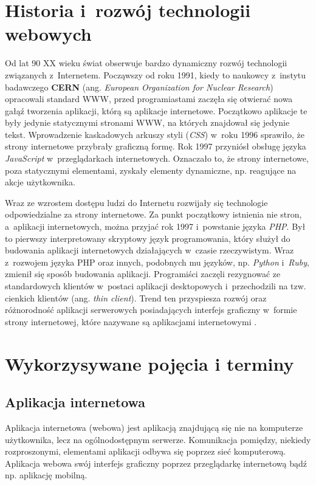 \documentclass[mgr,oneside]{mgr}
\begin{document}
\section{Historia i~rozwój technologii webowych}
Od lat 90 XX wieku świat obserwuje bardzo dynamiczny rozwój technologii związanych z~Internetem. Począwszy od roku 1991, kiedy to naukowcy z~instytu badawczego \textbf{CERN} (ang. \textit{European Organization for Nuclear Research}) opracowali standard WWW, przed programiastami zaczęła się otwierać nowa gałąź tworzenia aplikacji, którą są aplikacje internetowe. Początkowo aplikacje te były jedynie statycznymi stronami WWW, na których znajdował się jedynie tekst. Wprowadzenie kaskadowych arkuszy styli (\emph{CSS}) w~roku 1996 sprawiło, że strony internetowe przybrały graficzną formę. Rok 1997 przyniósł obsługę języka \emph{JavaScript} w~przeglądarkach internetowych. Oznaczało to, że strony internetowe, poza statycznymi elementami, zyskały elementy dynamiczne, np. reagujące na akcje użytkownika.

Wraz ze wzrostem dostępu ludzi do Internetu rozwijały się technologie odpowiedzialne za strony internetowe. Za punkt początkowy istnienia nie stron, a~aplikacji internetowych, można przyjać rok 1997 i~powstanie języka \emph{PHP}. Był to pierwszy interpretowany skryptowy język programowania, który służył do budowania aplikacji internetowych działających w~czasie rzeczywistym. Wraz z~rozwojem języka PHP oraz innych, podobnych mu języków, np. \emph{Python} i~\emph{Ruby}, zmienił się sposób budowania aplikacji. Programiści zaczęli rezygnować ze standardowych klientów w~postaci aplikacji desktopowych i~przechodzili na tzw. cienkich klientów (ang. \textit{thin client}). Trend ten przyspiesza rozwój oraz różnorodność aplikacji serwerowych posiadających interfejs graficzny w~formie strony internetowej, które nazywane są aplikacjami internetowymi \cite{historia}.

\section{Wykorzysywane pojęcia i terminy}
\subsection{Aplikacja internetowa}
Aplikacja internetowa (webowa) jest aplikacją znajdującą się nie na komputerze użytkownika, lecz na ogólnodostępnym serwerze. Komunikacja pomiędzy, niekiedy rozproszonymi, elementami aplikacji odbywa się poprzez sieć komputerową. Aplikacja webowa swój interfejs graficzny poprzez przeglądarkę internetową bądź np. aplikację mobilną.
\end{document}
